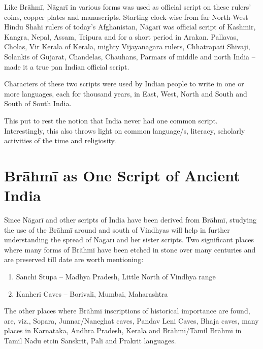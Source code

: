 Like Brāhmī, Nāgarī in various forms was used as official script on these rulers’ coins, copper plates and manuscripts. Starting clock-wise from far North-West Hindu Shahi rulers of today’s Afghanistan, Nāgarī was official script of Kashmir, Kangra, Nepal, Assam, Tripura and for a short period in Arakan. Pallavas, Cholas, Vir Kerala of Kerala, mighty Vijayanagara rulers, Chhatrapati Shivaji, Solankis of Gujarat, Chandelas, Chauhans, Parmars of middle and north India – made it a true pan Indian official script.

Characters of these two scripts were used by Indian people to write in one or more languages, each for thousand years, in East, West, North and South and South of South India.

This put to rest the notion that India never had one common script. Interestingly, this also throws light on common language/s, literacy, scholarly activities of the time and religiosity.


\section*{Brāhmī as One Script of Ancient India}

Since Nāgarī and other scripts of India have been derived from Brāhmī, studying the use of the Brāhmī around and south of Vindhyas will help in further understanding the spread of Nāgarī and her sister scripts. Two significant places where many forms of Brāhmī have been etched in stone over many centuries and are preserved till date are worth mentioning:

\begin{enumerate}[{\rm 1)}]
\itemsep=0pt
\item Sanchi Stupa – Madhya Pradesh, Little North of Vindhya range

 \item Kanheri Caves – Borivali, Mumbai, Maharashtra

\end{enumerate}

The other places where Brāhmī inscriptions of historical importance are found, are, viz., Sopara, Junnar/Naneghat caves, Pandav Leni Caves, Bhaja caves, many places in Karnataka, Andhra Pradesh, Kerala and Brāhmī/Tamil Brāhmī in Tamil Nadu etcin Sanskrit, Pali and Prakrit languages.

